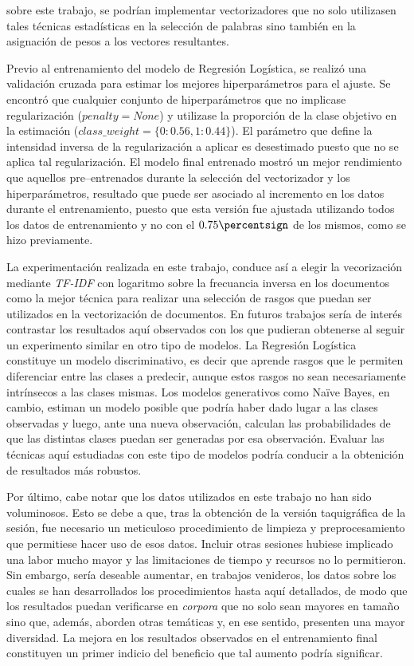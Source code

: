 sobre este trabajo, se podr\'ian implementar vectorizadores que
no solo utilizasen tales t\'ecnicas estad\'isticas en la selecci\'on
de palabras sino tambi\'en en la asignaci\'on de pesos a los vectores resultantes.
\par
Previo al entrenamiento del modelo de Regresi\'on Log\'istica, se
realiz\'o una validaci\'on cruzada para estimar los mejores hiperpar\'ametros
para el ajuste. Se encontr\'o que cualquier conjunto de hiperpar\'ametros
que no implicase regularizaci\'on ($penalty=None$) y utilizase
la proporci\'on de la clase objetivo en la estimaci\'on
($class\_weight=\lbrace0:0.56, 1:0.44\rbrace$). El par\'ametro que define
la intensidad inversa de la regularizaci\'on a aplicar es desestimado
puesto que no se aplica tal regularizaci\'on. El modelo final entrenado
mostr\'o un mejor rendimiento que aquellos pre{--}entrenados
durante la selecci\'on del vectorizador y los hiperpar\'ametros, resultado que
puede ser asociado al incremento en los datos durante el entrenamiento,
puesto que esta versi\'on fue ajustada utilizando todos los datos
de entrenamiento y no con el $0.75\percentsign$ de los mismos,
como se hizo previamente.
\par
La experimentaci\'on realizada en este trabajo, conduce as\'i a elegir
la vecorizaci\'on mediante \textit{TF-IDF} con logaritmo sobre la
frecuancia inversa en los documentos como la mejor t\'ecnica para
realizar una selecci\'on de rasgos que puedan ser utilizados en la
vectorizaci\'on de documentos. En futuros trabajos ser\'ia de inter\'es
contrastar los resultados aqu\'i observados con los que pudieran obtenerse
al seguir un experimento similar en otro tipo de modelos.
La Regresi\'on Log\'istica constituye un modelo discriminativo, es decir
que aprende rasgos que le permiten diferenciar entre las clases
a predecir, aunque estos rasgos no sean necesariamente intr\'insecos
a las clases mismas. Los modelos generativos como Naïve Bayes, en cambio, estiman un
modelo posible que podr\'ia haber dado lugar a las clases observadas y
luego, ante una nueva observaci\'on, calculan las probabilidades de que
las distintas clases puedan ser generadas por esa observaci\'on.
Evaluar las t\'ecnicas aqu\'i estudiadas con este tipo de modelos podr\'ia
conducir a la obtenici\'on de resultados m\'as robustos.
\par
Por \'ultimo, cabe notar que los datos utilizados en este trabajo
no han sido voluminosos. Esto se debe a que, tras la obtenci\'on
de la versi\'on taquigr\'afica de la sesi\'on, fue necesario un
meticuloso procedimiento de limpieza y preprocesamiento que permitiese
hacer uso de esos datos. Incluir otras sesiones hubiese implicado
una labor mucho mayor y las limitaciones de tiempo y recursos no
lo permitieron. Sin embargo, ser\'ia deseable aumentar, en trabajos
venideros, los datos sobre los cuales se han desarrollados los procedimientos
hasta aqu\'i detallados, de modo que los resultados puedan verificarse en
\textit{corpora} que no solo sean mayores en tamaño sino que, adem\'as,
aborden otras tem\'aticas y, en ese sentido, presenten una mayor
diversidad. La mejora en los resultados observados en el entrenamiento
final constituyen un primer indicio del beneficio que tal aumento podr\'ia
significar.